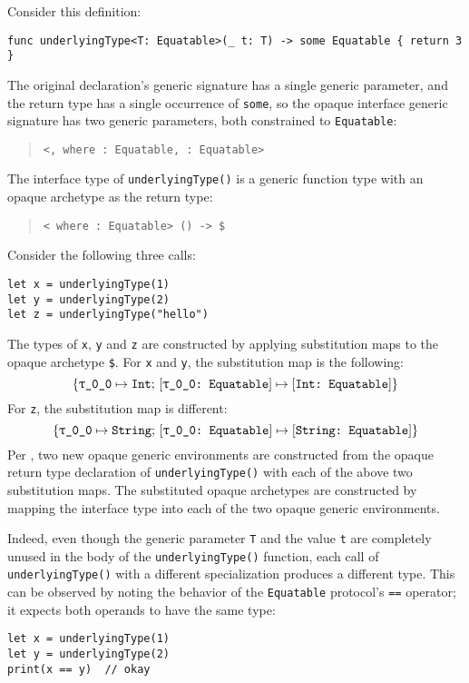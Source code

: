 \documentclass[../generics]{subfiles}
\begin{document}
\begin{example} Consider this definition:
\begin{Verbatim}
func underlyingType<T: Equatable>(_ t: T) -> some Equatable { return 3 }
\end{Verbatim}
The original declaration's generic signature has a single generic parameter, and the return type has a single occurrence of \texttt{some}, so the opaque interface generic signature has two generic parameters, both constrained to \texttt{Equatable}:
\begin{quote}
\texttt{<,  where :\ Equatable, :\ Equatable>}
\end{quote}
The interface type of \texttt{underlyingType()} is a generic function type with an opaque archetype as the return type:
\begin{quote}
\texttt{< where :\ Equatable> () -> \$}
\end{quote}
Consider the following three calls:
\begin{Verbatim}
let x = underlyingType(1)
let y = underlyingType(2)
let z = underlyingType("hello")
\end{Verbatim}
The types of \texttt{x}, \texttt{y} and \texttt{z} are constructed by applying substitution maps to the opaque archetype \texttt{\$}. For \texttt{x} and \texttt{y}, the substitution map is the following:
\[
\SubstMapC{
\SubstType{\ttgp{0}{0}}{Int}
}{
\SubstConf{\ttgp{0}{0}}{Int}{Equatable}
}
\]
For \texttt{z}, the substitution map is different:
\[
\SubstMapC{
\SubstType{\ttgp{0}{0}}{String}
}{
\SubstConf{\ttgp{0}{0}}{String}{Equatable}
}
\]
Per , two new opaque generic environments are constructed from the opaque return type declaration of \texttt{underlyingType()} with each of the above two substitution maps. The substituted opaque archetypes are constructed by mapping the interface type \texttt{} into each of the two opaque generic environments.

Indeed, even though the generic parameter \texttt{T} and the value \texttt{t} are completely unused in the body of the \texttt{underlyingType()} function, each call of \texttt{underlyingType()} with a different specialization produces a different type. This can be observed by noting the behavior of the \texttt{Equatable} protocol's \texttt{==} operator; it expects both operands to have the same type:
\begin{Verbatim}
let x = underlyingType(1)
let y = underlyingType(2)
print(x == y)  // okay


\end{Verbatim}
\end{example}
\end{document}
